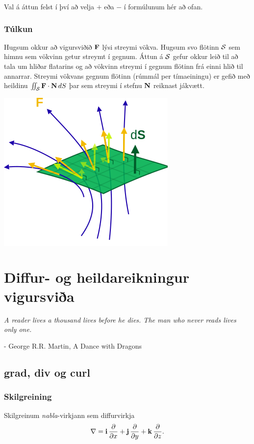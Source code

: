 \documentclass[a4paper,10pt,icelandic]{sphinxmanual}
\begin{document}
Val á áttun felst í því að velja \(+\) eða \(-\) í formúlunum
hér að ofan.


\subsection{Túlkun}
\label{Kafli5:tulkun}
Hugsum okkur að vigursviðið \(\mbox{${\bf F}$}\) lýsi streymi vökva.
Hugsum svo flötinn \(\cal S\) sem himnu sem vökvinn getur streymt í
gegnum. Áttun á \(\cal S\) gefur okkur leið til að tala um hliðar
flatarins og að vökvinn streymi í gegnum flötinn frá einni hlið til
annarrar. Streymi vökvans gegnum flötinn (rúmmál per tímaeiningu) er
gefið með heildinu
\(\int\!\!\!\int_{\cal S} \mbox{${\bf F}$}\cdot\mbox{${\bf N}$}\,dS\)
þar sem streymi í stefnu \(\mbox{${\bf N}$}\) reiknast jákvætt.

{\hfill\includegraphics[width=0.400\linewidth]{flux.png}\hfill}


\chapter{Diffur- og heildareikningur vigursviða}
\label{Kafli6::doc}\label{Kafli6:diffur-og-heildareikningur-vigursvia}
\emph{A reader lives a thousand lives before he dies. The man who never reads lives only one.}

- George R.R. Martin, A Dance with Dragons


\section{grad, div og curl}
\label{Kafli6:grad-div-og-curl}

\subsection{Skilgreining}
\label{Kafli6:skilgreining}
Skilgreinum \emph{nabla}-virkjann sem diffurvirkja
\begin{gather}
\begin{split}\displaystyle \nabla=\mbox{${\bf i}$}\,\frac{\partial}{\partial x}+\mbox{${\bf j}$}\,\frac{\partial}{\partial y}+\mbox{${\bf k}$}\,\frac{\partial}{\partial z}.\end{split}\notag
\end{gather}
\end{document}
